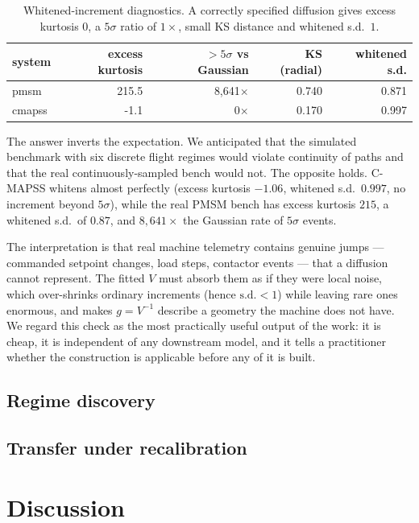 \documentclass[11pt]{article}
\begin{document}
\begin{table}[t]
\centering\small
\caption{Whitened-increment diagnostics. A correctly specified diffusion gives excess kurtosis $0$, a $5\sigma$ ratio of $1\times$, small KS distance and whitened s.d.\ $1$.}
\label{tab:diffusion}
\begin{tabular}{lrrrr}
\toprule
system & excess kurtosis & $>5\sigma$ vs Gaussian & KS (radial) & whitened s.d. \\
\midrule
pmsm & 215.5 & 8,641$\times$ & 0.740 & 0.871 \\
cmapss & -1.1 & 0$\times$ & 0.170 & 0.997 \\
\bottomrule
\end{tabular}
\end{table}


The answer inverts the expectation. We anticipated that the simulated benchmark
with six discrete flight regimes would violate continuity of paths and that the
real continuously-sampled bench would not. The opposite holds. C-MAPSS whitens
almost perfectly (excess kurtosis $-1.06$, whitened s.d.\ $0.997$, no
increment beyond $5\sigma$), while the real PMSM bench has excess kurtosis
$215$, a whitened s.d.\ of $0.87$, and $8{,}641\times$ the Gaussian rate of
$5\sigma$ events.

The interpretation is that real machine telemetry contains genuine jumps ---
commanded setpoint changes, load steps, contactor events --- that a diffusion
cannot represent. The fitted $V$ must absorb them as if they were local noise,
which over-shrinks ordinary increments (hence $\mathrm{s.d.}<1$) while leaving
rare ones enormous, and makes $g=V^{-1}$ describe a geometry the machine does
not have. We regard this check as the most practically useful output of the
work: it is cheap, it is independent of any downstream model, and it tells a
practitioner whether the construction is applicable before any of it is built.

\subsection{Regime discovery}



\subsection{Transfer under recalibration}


\section{Discussion}
\end{document}
